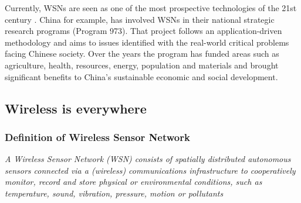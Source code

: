 Currently, WSNs are seen as one of the most prospective technologies of the 21st century . China for example, has involved WSNs in their national strategic research programs (Program 973)\citep{CHINA}. That project follows an application-driven methodology and aims to issues identified with the real-world critical problems facing Chinese society. Over the years the program has funded areas such as agriculture, health, resources, energy, population and materials and brought significant benefits to China's sustainable economic and social development.
\subsection{Wireless is everywhere}
\subsubsection{Definition of Wireless Sensor Network}
\emph{A Wireless Sensor Network (WSN) consists of spatially distributed autonomous sensors connected via a (wireless) communications infrastructure to cooperatively monitor, record and store physical or
environmental conditions, such as temperature, sound, vibration, pressure, motion or pollutants} \citep{SEBA}
